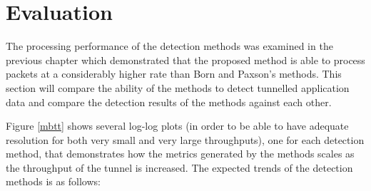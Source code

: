 \documentclass[12pt]{report}
\theoremstyle{remark}
\theoremstyle{definition}
\theoremstyle{definition}
\theoremstyle{definition}
\begin{document}
\chapter{Evaluation}
\label{chap-evaluation}
\label{tunnel-detection-performance}

The processing performance of the detection methods was examined in the previous
chapter which demonstrated that the proposed method is able to process packets
at a considerably higher rate than Born and Paxson's methods. This section will
compare the ability of the methods to detect tunnelled application data and
compare the detection results of the methods against each other.

Figure \ref{mbtt} shows several log-log plots (in order to be able to have
adequate resolution for both very small and very large throughputs), one for
each detection method, that demonstrates how the metrics generated by the
methods scales as the throughput of the tunnel is increased. The expected trends
of the detection methods is as follows:
\end{document}
